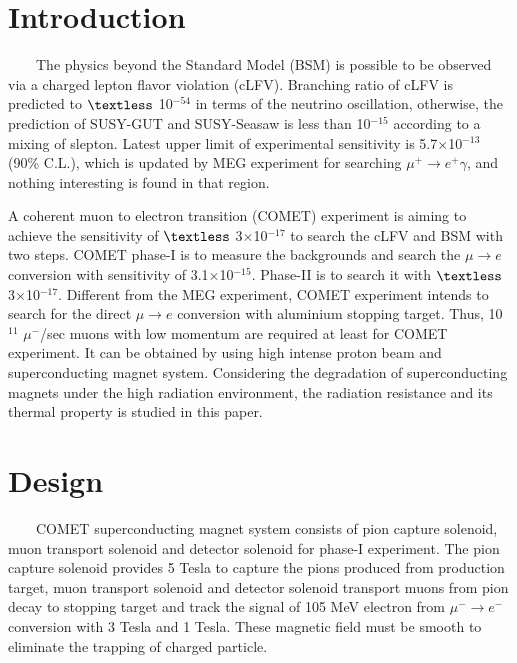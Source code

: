 \documentclass[a4paper, 10pt, twocolumn]{article}
\title{\begin{CJK}{UTF8}{min}\normalsize Radiation study on the Superconducting Solenoid Magnet for $\mu^- \rightarrow e^-$ Conversion Experiment\\
\author{\begin{CJK}{UTF8}{min} ~~~~~~~~~~~~~~~~~~~~~~~~~~~~~~~~~~~~~~~~~~~~~~~~~~~~~~~~~~~~~~~~~~~~~~~~~~~~~~~~~~~~~~~~~~~~~~~~~~~~~~~~~~~~~~~~~~~~~~~~~~~~~                               ~~~$BML(B $B3p(B\end{CJK}}
\date{}
\begin{document}
\maketitle

\section{Introduction}
~~~~The physics beyond the Standard Model (BSM) is possible to be observed via a charged lepton flavor violation (cLFV).
Branching ratio of cLFV is predicted to $\textless$ 10$^{-54}$ in terms of the neutrino oscillation, otherwise, the prediction of SUSY-GUT and SUSY-Seasaw is less than 10$^{-15}$ according to a mixing of slepton.
Latest upper limit of experimental sensitivity is 5.7$\times$10$^{-13}$ (90\% C.L.), which is updated by MEG experiment for searching $\mu^+ \rightarrow e^+\gamma$, and nothing interesting is found in that region.

A coherent muon to electron transition (COMET) experiment is aiming to achieve the sensitivity of $\textless$ 3$\times$10$^{-17}$ to search the cLFV and BSM with two steps.
COMET phase-I is to measure the backgrounds and search the $\mu \rightarrow e$ conversion with sensitivity of 3.1$\times$10$^{-15}$.
Phase-II is to search it with $\textless$ 3$\times$10$^{-17}$.
Different from the MEG experiment, COMET experiment intends to search for the direct $\mu \rightarrow e$ conversion with aluminium stopping target.
Thus, %
10$^{11}$ $\mu^-$/sec muons with low momentum are required at least for COMET experiment.
It can be obtained by using high intense proton beam and superconducting magnet system.
Considering the degradation of superconducting magnets under the high radiation environment, the radiation resistance and its thermal property is studied in this paper.

\section{Design}
~~~~COMET superconducting magnet system consists of pion capture solenoid, muon transport solenoid and detector solenoid for phase-I experiment.
The pion capture solenoid provides 5 Tesla to capture the pions produced from production target, muon transport solenoid and detector solenoid transport muons from pion decay to stopping target and track the signal of 105 MeV electron from $\mu^- \rightarrow e^-$ conversion with 3 Tesla and 1 Tesla.
These magnetic field must be smooth to eliminate the trapping of charged particle.
\end{document}
